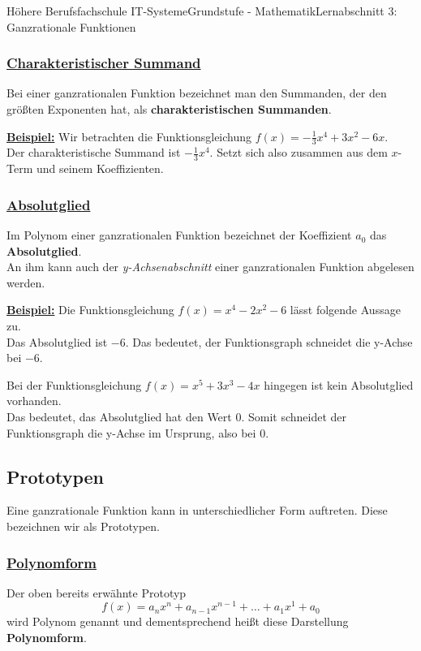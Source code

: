 \documentclass[11pt,twocolumn,oneside,openany,headings=optiontotoc,11pt,numbers=noenddot]{article}
\begin{document}
\begin{worksheet}{Höhere Berufsfachschule IT-Systeme}{Grundstufe - Mathematik}{Lernabschnitt 3: Ganzrationale Funktionen}
		\subsubsection*{\underline{Charakteristischer Summand}}
		Bei einer ganzrationalen Funktion bezeichnet man den Summanden, der den größten Exponenten hat, als \textbf{charakteristischen Summanden}.\\
		\par\noindent
		\underline{\textbf{Beispiel:}} Wir betrachten die Funktionsgleichung \(f(x) = -\frac{1}{3}x^4 + 3x^2 - 6x\).\\
		Der charakteristische Summand ist \colorbox{green!10}{\(-\frac{1}{3}x^4\)}. Setzt sich also zusammen aus dem \(x\)-Term und seinem Koeffizienten.
		\subsubsection*{\underline{Absolutglied}}
		Im Polynom einer ganzrationalen Funktion bezeichnet der Koeffizient \(a_0\) das \textbf{Absolutglied}.\\
		An ihm kann auch der \textit{y-Achsenabschnitt} einer ganzrationalen Funktion abgelesen werden.\\
		\par\noindent
		\underline{\textbf{Beispiel:}} Die Funktionsgleichung \(f(x) = x^4 - 2x^2 - 6\) lässt folgende Aussage zu.\\
		Das Absolutglied ist \colorbox{green!10}{\(-6\)}. Das bedeutet, der Funktionsgraph schneidet die y-Achse bei \(-6\).\\
		\par\noindent
		Bei der Funktionsgleichung \(f(x) = x^5 +3x^3 - 4x\) hingegen ist kein Absolutglied vorhanden.\\
		Das bedeutet, das Absolutglied hat den Wert \colorbox{green!10}{\(0\)}. Somit schneidet der Funktionsgraph die y-Achse im Ursprung, also bei \(0\).
		\subsection{Prototypen}
		Eine ganzrationale Funktion kann in unterschiedlicher Form auftreten. Diese bezeichnen wir als Prototypen.
		\subsubsection*{\underline{Polynomform}}
		Der oben bereits erwähnte Prototyp \[f(x) = a_nx^n + a_{n-1}x^{n-1} + \ldots + a_1x^1 + a_0\] wird Polynom genannt und dementsprechend heißt diese Darstellung \textbf{Polynomform}.

\end{worksheet}
\end{document}
